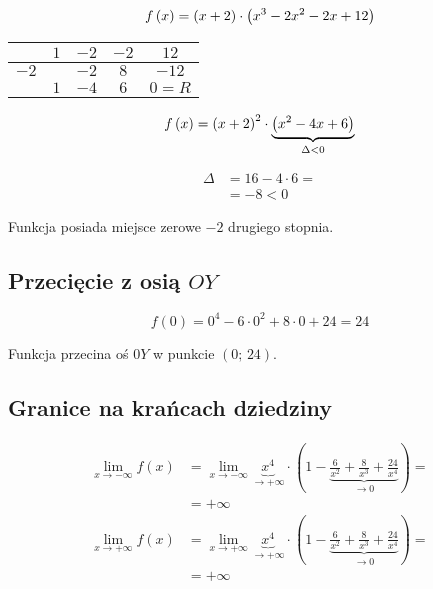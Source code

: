 \documentclass[a4paper,12pt]{article}
\newcommand{\fodx}{
		\ensuremath f \left( x \right)
	}
\begin{document}
\[\fodx =  \left(x + 2 \right) \cdot \left( x^3 - 2x^2 - 2x + 12 \right) \]

\begin{center}
	\begin{tabular}{l|c|c|c|c}
                           & $1$ & $-2$ & $-2$ & $12$    \\ \hline

		$-2$	&  & $-2$& $8$  & $-12$   \\ \hline

                           & $1$ & $-4$ & $6$  & $0 = R$ \\ 

\end{tabular}
\end{center}
\begin{minipage}[c]{0.7\textwidth}
	\[\fodx =  \left(x + 2 \right)^2 \cdot \underbrace{\left( x^2 - 4x + 6 \right)}_{\Delta < 0} \]
\end{minipage}
\hspace{0.15cm} \vline \hspace{0.15cm}
\begin{minipage}[c]{0.2\textwidth}
	\begin{align*}
		\Delta &= 16 - 4 \cdot 6 = \\
		&= -8 < 0
	\end{align*}
\end{minipage}
\vspace{0.5cm}

Funkcja posiada miejsce zerowe $-2$ drugiego stopnia.

\subsection{Przecięcie z osią $OY$}

\[f \left( 0 \right) = 0^4  - 6\cdot 0^2 + 8\cdot 0 + 24 = 24 \]

Funkcja przecina oś $0Y$ w punkcie $ \left( 0; \, 24 \right)$.

\subsection{Granice na krańcach dziedziny}

\begin{align*}
	\lim\limits_{x \to - \infty} f \left( x \right) &=\lim\limits_{x \to - \infty} \underbrace{x^4}_{\to + \infty} \cdot \left( 1 - \underbrace{\frac{6}{x^2} + \frac{8}{x^3} + \frac{24}{x^4}}_{\to 0} \right) =\\
	&= + \infty \\
	\lim\limits_{x \to + \infty} f\left( x \right) &= \lim\limits_{x \to +\infty} \underbrace{x^4}_{\to + \infty} \cdot \left( 1 - \underbrace{\frac{6}{x^2} + \frac{8}{x^3} + \frac{24}{x^4}}_{\to 0} \right) = \\
	&= + \infty
\end{align*}
\end{document}
